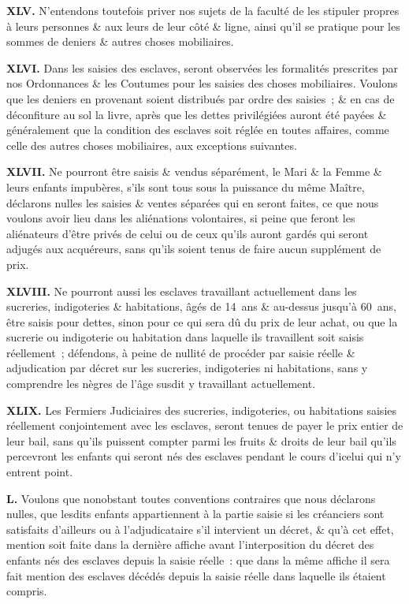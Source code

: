 \documentclass[twoside]{book} %
\newcommand{\labelchar}[1]{\textbf{\color{rubric} #1}}
\begin{document}
\labelchar{XLV.} N’entendons toutefois priver nos sujets de la faculté de les stipuler propres à leurs personnes \& aux leurs de leur côté \& ligne, ainsi qu’il se pratique pour les sommes de deniers \& autres choses mobiliaires.\par
\labelchar{XLVI.} Dans les saisies des esclaves, seront observées les formalités prescrites par nos Ordonnances \& les Coutumes pour les saisies des choses mobiliaires. Voulons que les deniers en provenant soient distribués par ordre des saisies ; \& en cas de déconfiture au sol la livre, après que les dettes privilégiées auront été payées \& généralement que la condition des esclaves soit réglée en toutes affaires, comme celle des autres choses mobiliaires, aux exceptions suivantes.\par
\labelchar{XLVII.} Ne pourront être saisis \& vendus séparément, le Mari \& la Femme \& leurs enfants impubères, s’ils sont tous sous la puissance du même Maître, déclarons nulles les saisies \& ventes séparées qui en seront faites, ce que nous voulons avoir lieu dans les aliénations volontaires, si peine que feront les aliénateurs d’être privés de celui ou de ceux qu’ils auront gardés qui seront adjugés aux acquéreurs, sans qu’ils soient tenus de faire aucun supplément de prix.\par
\labelchar{XLVIII.} Ne pourront aussi les esclaves travaillant actuellement dans les sucreries, indigoteries \& habitations, âgés de 14 ans \& au-dessus jusqu’à 60 ans, être saisis pour dettes, sinon pour ce qui sera dû du prix de leur achat, ou que la sucrerie ou indigoterie ou habitation dans laquelle ils travaillent soit saisis réellement ; défendons, à peine de nullité de procéder par saisie réelle \& adjudication par décret sur les sucreries, indigoteries ni habitations, sans y comprendre les nègres de l’âge susdit y travaillant actuellement.\par
\labelchar{XLIX.} Les Fermiers Judiciaires des sucreries, indigoteries, ou habitations saisies réellement conjointement avec les esclaves, seront tenues de payer le prix entier de leur bail, sans qu’ils puissent compter parmi les fruits \& droits de leur bail qu’ils percevront les enfants qui seront nés des esclaves pendant le cours d’icelui qui n’y entrent point.\par
\labelchar{L.} Voulons que nonobstant toutes conventions contraires que nous déclarons nulles, que lesdits enfants appartiennent à la partie saisie si les créanciers sont satisfaits d’ailleurs ou à l’adjudicataire s’il intervient un décret, \& qu’à cet effet, mention soit faite dans la dernière affiche avant l’interposition du décret des enfants nés des esclaves depuis la saisie réelle : que dans la même affiche il sera fait mention des esclaves décédés depuis la saisie réelle dans laquelle ils étaient compris.\par
\end{document}
